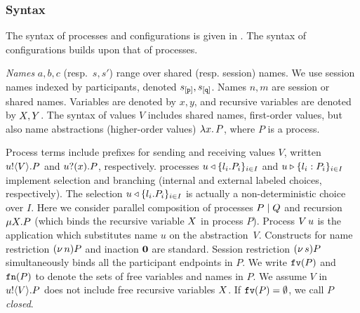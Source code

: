 \documentclass[runningheads]{llncs}
\newcommand{\erase}[1]{#1}
\begin{document}
\subsubsection{Syntax}
The syntax of processes and configurations is given in .
The syntax of configurations builds upon that of processes.

\emph{Names} $a,b,c$ (resp.~$s, s'$) 
range over shared (resp. session) names. 
We use session names indexed by  {participants}, denoted $s_{[\mathtt{p}]}, s_{[\mathtt{q}]}$. 
Names $n, m$ are session or shared names.
Variables are denoted by $x, y$, 
and recursive variables are denoted by $X, Y$.
The syntax of values $V$ includes shared names, first-order values, but also 
name abstractions (higher-order values)
$\lambda x.\,P$,   where $P$ is a process.

Process terms include   prefixes for sending and receiving values $V$, written 
$u ! \langle V \rangle . P$ and $u ? (x) . P$, respectively.
\erase{
processes $u \triangleleft \{l_i. P_i\}_{i\in I}$ and $u \triangleright \{l_i: P_i\}_{i \in I}$ implement 
selection and branching (internal and external labeled choices, respectively). 
The selection  $u \triangleleft \{l_i. P_i\}_{i\in I}$ is actually 
a non-deterministic choice over $I$.}
Here we consider parallel composition of processes $P \;|\; Q$ 
and recursion $\mu X. P$ (which binds the recursive variable $X$ in process $P$).
Process 
$V\, {u}$ 
is the application
which substitutes name $u$ on the abstraction~$V$. %
Constructs for 
name restriction $(\nu\, n) P$ and 
inaction $\mathbf{0}$ are standard.
Session restriction $(\nu\, s) P$ simultaneously binds all the participant endpoints in $P$.
We write $\mathtt{fv}(P)$ and $\mathtt{fn}(P)$ %
to denote the sets of free 
variables 
and names in $P$.
We assume $V$ in $u ! \langle V \rangle .{P}$ does not include free recursive 
variables $X$.
If $\mathtt{fv}(P) = \emptyset$, we call $P$ {\em closed}.
\end{document}
